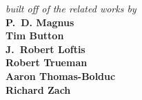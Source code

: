 \documentclass[openany,oneside,14pt]{memoir}
\begin{document}
\begin{textblock*}{0in}
\begin{minipage}[b][\stockheight][s]{.95\stockwidth}
\begin{raggedleft}
     \textit{built off of the related works by}\\
      \textbf{P.~D. Magnus}\\
      \textbf{Tim Button}\\
      \textbf{J.~Robert Loftis}\\
      \textbf{Robert Trueman}\\
      \textbf{Aaron Thomas-Bolduc}\\
      \textbf{Richard Zach}\\
      \vspace{1cm}
      \textbf{\forallxversion}\par
      \vspace{1cm}
    \end{raggedleft}
  \end{minipage}
  \hspace*{1cm}
\end{textblock*}
\ 
\newpage
\color{black}
\setlength{\barlength}{0pt} %


\end{document}
